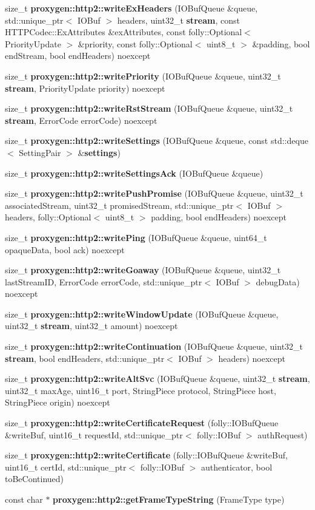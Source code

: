 \begin{DoxyCompactItemize}
\item 
size\+\_\+t {\bf proxygen\+::http2\+::write\+Ex\+Headers} (I\+O\+Buf\+Queue \&queue, std\+::unique\+\_\+ptr$<$ I\+O\+Buf $>$ headers, uint32\+\_\+t {\bf stream}, const H\+T\+T\+P\+Codec\+::\+Ex\+Attributes \&ex\+Attributes, const folly\+::\+Optional$<$ Priority\+Update $>$ \&priority, const folly\+::\+Optional$<$ uint8\+\_\+t $>$ \&padding, bool end\+Stream, bool end\+Headers) noexcept
\item 
size\+\_\+t {\bf proxygen\+::http2\+::write\+Priority} (I\+O\+Buf\+Queue \&queue, uint32\+\_\+t {\bf stream}, Priority\+Update priority) noexcept
\item 
size\+\_\+t {\bf proxygen\+::http2\+::write\+Rst\+Stream} (I\+O\+Buf\+Queue \&queue, uint32\+\_\+t {\bf stream}, Error\+Code error\+Code) noexcept
\item 
size\+\_\+t {\bf proxygen\+::http2\+::write\+Settings} (I\+O\+Buf\+Queue \&queue, const std\+::deque$<$ Setting\+Pair $>$ \&{\bf settings})
\item 
size\+\_\+t {\bf proxygen\+::http2\+::write\+Settings\+Ack} (I\+O\+Buf\+Queue \&queue)
\item 
size\+\_\+t {\bf proxygen\+::http2\+::write\+Push\+Promise} (I\+O\+Buf\+Queue \&queue, uint32\+\_\+t associated\+Stream, uint32\+\_\+t promised\+Stream, std\+::unique\+\_\+ptr$<$ I\+O\+Buf $>$ headers, folly\+::\+Optional$<$ uint8\+\_\+t $>$ padding, bool end\+Headers) noexcept
\item 
size\+\_\+t {\bf proxygen\+::http2\+::write\+Ping} (I\+O\+Buf\+Queue \&queue, uint64\+\_\+t opaque\+Data, bool ack) noexcept
\item 
size\+\_\+t {\bf proxygen\+::http2\+::write\+Goaway} (I\+O\+Buf\+Queue \&queue, uint32\+\_\+t last\+Stream\+ID, Error\+Code error\+Code, std\+::unique\+\_\+ptr$<$ I\+O\+Buf $>$ debug\+Data) noexcept
\item 
size\+\_\+t {\bf proxygen\+::http2\+::write\+Window\+Update} (I\+O\+Buf\+Queue \&queue, uint32\+\_\+t {\bf stream}, uint32\+\_\+t amount) noexcept
\item 
size\+\_\+t {\bf proxygen\+::http2\+::write\+Continuation} (I\+O\+Buf\+Queue \&queue, uint32\+\_\+t {\bf stream}, bool end\+Headers, std\+::unique\+\_\+ptr$<$ I\+O\+Buf $>$ headers) noexcept
\item 
size\+\_\+t {\bf proxygen\+::http2\+::write\+Alt\+Svc} (I\+O\+Buf\+Queue \&queue, uint32\+\_\+t {\bf stream}, uint32\+\_\+t max\+Age, uint16\+\_\+t port, String\+Piece protocol, String\+Piece host, String\+Piece origin) noexcept
\item 
size\+\_\+t {\bf proxygen\+::http2\+::write\+Certificate\+Request} (folly\+::\+I\+O\+Buf\+Queue \&write\+Buf, uint16\+\_\+t request\+Id, std\+::unique\+\_\+ptr$<$ folly\+::\+I\+O\+Buf $>$ auth\+Request)
\item 
size\+\_\+t {\bf proxygen\+::http2\+::write\+Certificate} (folly\+::\+I\+O\+Buf\+Queue \&write\+Buf, uint16\+\_\+t cert\+Id, std\+::unique\+\_\+ptr$<$ folly\+::\+I\+O\+Buf $>$ authenticator, bool to\+Be\+Continued)
\item 
const char $\ast$ {\bf proxygen\+::http2\+::get\+Frame\+Type\+String} (Frame\+Type type)
\end{DoxyCompactItemize}
